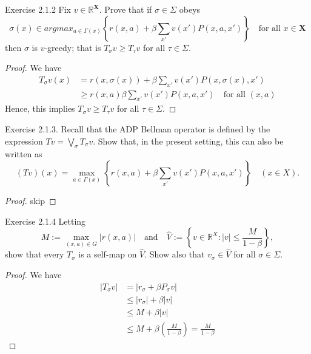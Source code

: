 \begin{frame}{Exercise 2.1.2}
Fix $v\in\mathbb{R}^{\mathbf{X}}$. Prove that if $\sigma\in\Sigma$ obeys
$$
\sigma(x) \in argmax_{a\in\Gamma(x)} \left\{r(x,a)+\beta\sum_{x'}v(x')P(x,a,x')\right\}\quad \text{for all $x\in\mathbf{X}$}
$$
then $\sigma$ is $v$-greedy; that is  $T_\sigma v\ge T_\tau v$ for all $\tau\in\Sigma$.
\begin{proof}
    We have 
    \begin{align*}
        T_\sigma v (x) &= r(x,\sigma (x)) + \beta\sum_{x'}v(x')P(x,\sigma(x),x')\\
        &\ge r(x,a) \beta\sum_{x'}v(x')P(x,a,x')\quad \text{for all $(x,a)$}
    \end{align*}
Hence, this implies $T_\sigma v\ge T_\tau v$ for all $\tau\in\Sigma$.
\end{proof}
\end{frame}

\begin{frame}{Exercise 2.1.3.}
Recall that the ADP Bellman operator is defined by the expression $Tv = \bigvee_\sigma T_\sigma v$. Show that, in the present setting, this can also be written as
\begin{equation*}
(T v)(x) = \max_{a\in\Gamma(x)} \left\{r(x,a) + \beta \sum_{x'} v(x')P(x,a,x') \right\} \quad (x \in X).
\end{equation*}
\begin{proof}
    skip
\end{proof}
\end{frame}


\begin{frame}{Exercise 2.1.4}
    Letting
\begin{equation}
M := \max_{(x,a)\in G} |r(x,a)| \quad \text{and} \quad \hat{V} := \left\{v \in \mathbb{R}^X : |v| \leq \frac{M}{1-\beta} \right\},
\end{equation}
show that every $T_\sigma$ is a self-map on $\hat{V}$. Show also that $v_\sigma \in \hat{V}$ for all $\sigma \in \Sigma$.

\begin{proof}
    We have
    \begin{align*}
    |T_\sigma v| & = |r_\sigma + \beta P_\sigma v|\\
    &\le |r_\sigma |+\beta |v|\\
    &\le M +\beta |v|\\
    &\le M+\beta (\frac{M}{1-\beta}) = \frac{M}{1-\beta}
    \end{align*}
\end{proof}
\end{frame}
